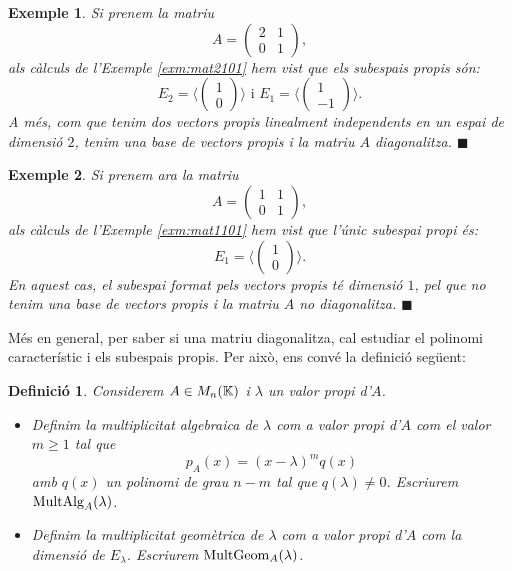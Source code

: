 \documentclass[
  11pt,
]{book}
\numberwithin{dummy}{section}
\theoremstyle{maincolornumbox}
\theoremstyle{blacknumex}
\newtheorem{exampleT}{Exemple}[chapter]
\theoremstyle{blacknumbox}
\newtheorem{definitionT}{Definició}[chapter]
\theoremstyle{maincolornum}
\newenvironment{definition}{\begin{dBox}\begin{definitionT}}{\end{definitionT}\end{dBox}}
\newenvironment{example}{\begin{exampleT}}{\hfill{\tiny\ensuremath{\blacksquare}}\end{exampleT}}
\newlength\esp
\begin{document}
\begin{example}
Si prenem la matriu \[A=\begin{pmatrix}2 & 1 \\ 0 & 1\end{pmatrix},\]
als càlculs de l'Exemple
\ref{exm:mat2101} hem vist que els subespais propis són:
\[E_2=\langle\begin{pmatrix}
1 \\ 0 
\end{pmatrix}\rangle
\text{ i }
E_1=\langle\begin{pmatrix}
1 \\ -1 
\end{pmatrix}\rangle.\] A més, com que tenim dos vectors propis
linealment independents en un espai de dimensió \(2\), tenim una base de
vectors propis i la matriu \(A\) diagonalitza.
\end{example}

\begin{example}
Si prenem ara la matriu
\[A=\begin{pmatrix}1 & 1 \\ 0 & 1\end{pmatrix},\] als càlculs de
l'Exemple \ref{exm:mat1101} hem vist que l'únic subespai propi és:
\[E_1=\langle\begin{pmatrix}
1 \\ 0 
\end{pmatrix}\rangle.\] En aquest cas, el subespai format pels vectors
propis té dimensió \(1\), pel que no tenim una base de vectors propis i la
matriu \(A\) no diagonalitza.
\end{example}

Més en general, per saber si una matriu diagonalitza, cal estudiar el
polinomi característic i els subespais propis. Per això, ens convé la
definició següent:

\begin{definition}

Considerem \(A\in M_n(\mathbb{K})\) i \(\lambda\) un valor propi d'\(A\).

\begin{itemize}
\item
  Definim la \emph{multiplicitat algebraica de \(\lambda\) com a valor propi
  d'\(A\)} com el valor \(m\geq 1\) tal que \[p_A(x)=(x-\lambda)^m q(x)\]
  amb \(q(x)\) un polinomi de grau \(n-m\) tal que \(q(\lambda)\neq 0\).
  Escriurem \(\operatorname{MultAlg}_A(\lambda)\).
\item
  Definim la \emph{multiplicitat geomètrica de \(\lambda\) com a valor propi
  d'\(A\)} com la dimensió de \(E_\lambda\). Escriurem
  \(\operatorname{MultGeom}_A(\lambda)\).
\end{itemize}

\end{definition}
\end{document}
